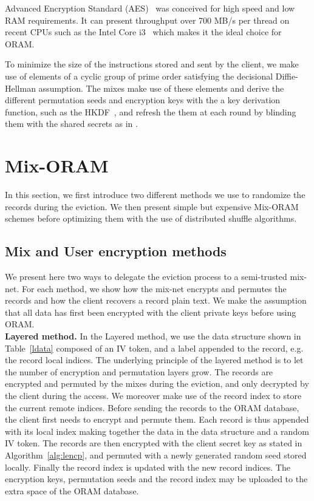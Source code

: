 \documentclass[USenglish,oneside,twocolumn]{article}
\begin{document}
Advanced Encryption Standard (AES)~\cite{daemen2013design} was conceived for high speed and low RAM requirements. It can present throughput over 700 MB/s per thread on recent CPUs such as the Intel Core i3~\cite{mcwilliams2014hardware} which makes it the ideal choice for ORAM.

To minimize the size of the instructions stored and sent by the client, we make use of elements of a cyclic group of prime order satisfying the decisional Diffie-Hellman assumption. The mixes make use of these elements and derive the different permutation seeds and encryption keys with the a key derivation function, such as the HKDF~\cite{krawczyk2010cryptographic}, and refresh the them at each round by blinding them with the shared secrets as in \cite{danezis2009sphinx}. 
%
\section{Mix-ORAM}\label{Mix-ORAM}
In this section, we first introduce two different methods we use to randomize the records during the eviction. We then present simple but expensive Mix-ORAM schemes before optimizing them with the use of distributed shuffle algorithms. 
%
\subsection{Mix and User encryption methods}\label{Enc}
We present here two ways to delegate the eviction process to a semi-trusted mix-net. For each method, we show how the mix-net encrypts and permutes the records and how the client recovers a record plain text.
We make the assumption that all data has first been encrypted with the client private keys  before using ORAM. \\

\noindent\textbf{Layered method.} In the Layered method, we use the data structure shown in Table~\ref{ldata} composed of an IV token, and a label appended to the record, e.g. the record local indices. The underlying principle of the layered method is to let the number of encryption and permutation layers grow. The records are encrypted and permuted by the mixes during the eviction, and only decrypted by the client during the access. We moreover make use of the record index to store the current remote indices. %
Before sending the records to the ORAM database, the client first needs to encrypt and permute them. Each record is thus appended with its local index making together the data in the data structure and a random IV token. The records are then encrypted with the client secret key as stated in Algorithm~\ref{alg:lencp}, and permuted with a newly generated random seed stored locally. Finally the record index is updated with the new record indices. The encryption keys, permutation seeds and the record index may be uploaded to the extra space of the ORAM database.\\
\end{document}
